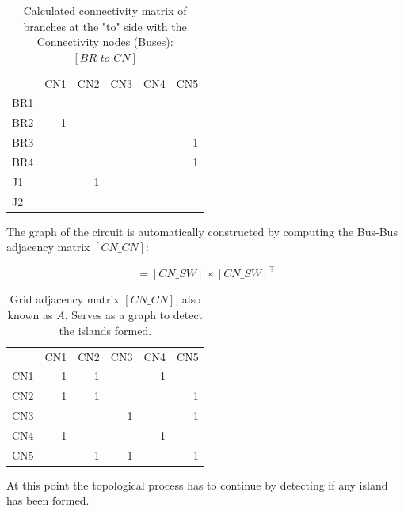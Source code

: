 \documentclass[nols,a4paper,twoside,notoc,fleqn]{tufte-book}
\begin{document}
\begin{table}[ht]
	 \begin{tabular}{lrrrrr}
		{} &  CN1 &  CN2 &  CN3 &  CN4 &  CN5 \\
		BR1 &      &      &      &      &      \\
		BR2 &    1 &      &      &      &      \\
		BR3 &      &      &      &      &    1 \\
		BR4 &      &      &      &      &    1 \\
		J1  &      &    1 &      &      &      \\
		J2  &      &      &      &      &      \\
	\end{tabular}
	\caption{Calculated connectivity matrix of branches at the "to" side with the Connectivity nodes (Buses): $[BR\_to\_CN]$}
\end{table}

\vspace{0.5cm}

The graph of the circuit is automatically constructed by computing the Bus-Bus adjacency matrix  $[CN\_CN]$:

\begin{equation}
[CN\_CN] = [CN\_SW] \times [CN\_SW]^\top
\end{equation}

\begin{table}[h!]
	\begin{tabular}{lrrrrr}
		{} &  CN1 &  CN2 &  CN3 &  CN4 &  CN5 \\
		CN1 &    1 &    1 &      &    1 &      \\
		CN2 &    1 &    1 &      &      &    1 \\
		CN3 &      &      &    1 &      &    1 \\
		CN4 &    1 &      &      &    1 &      \\
		CN5 &      &    1 &    1 &      &    1 \\
	\end{tabular}
	\caption{Grid adjacency matrix $[CN\_CN]$, also known as $A$. Serves as a graph to detect the islands formed.}
\end{table}

\vspace{0.5cm}

At this point the topological process has to continue by detecting if any island has been formed.
\end{document}
